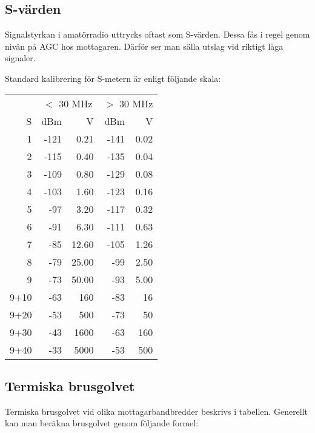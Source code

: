 \documentclass[10pt,swedish,a4paper,twoside]{article}
\begin{document}
\subsection{S-värden}

Signalstyrkan i amatörradio uttrycks oftast som S-värden. Dessa fås i regel genom nivån på AGC hos mottagaren. Därför ser man sälla utslag vid riktigt låga signaler.

Standard kalibrering för S-metern är enligt följande skala:

\begin{center}
\begin{tabular}{r|rr|rr}
	     & \multicolumn{2}{c|}{$<$ 30 MHz} & \multicolumn{2}{c}{$>$ 30 MHz} \\
	   S &  dBm &                \textmu V &  dBm &               \textmu V \\ \hline
	   1 & -121 &                     0.21 & -141 &                    0.02 \\
	   2 & -115 &                     0.40 & -135 &                    0.04 \\
	   3 & -109 &                     0.80 & -129 &                    0.08 \\
	   4 & -103 &                     1.60 & -123 &                    0.16 \\
	   5 &  -97 &                     3.20 & -117 &                    0.32 \\
	   6 &  -91 &                     6.30 & -111 &                    0.63 \\
	   7 &  -85 &                    12.60 & -105 &                    1.26 \\
	   8 &  -79 &                    25.00 &  -99 &                    2.50 \\
	   9 &  -73 &                    50.00 &  -93 &                    5.00 \\
	9+10 &  -63 &                      160 &  -83 &                      16 \\
	9+20 &  -53 &                      500 &  -73 &                      50 \\
	9+30 &  -43 &                     1600 &  -63 &                     160 \\
	9+40 &  -33 &                     5000 &  -53 &                     500
\end{tabular}
\end{center}
\subsection{Termiska brusgolvet}
Termiska brusgolvet vid olika mottagarbandbredder beskrivs i tabellen. Generellt kan man beräkna brusgolvet genom följande formel:
\end{document}
